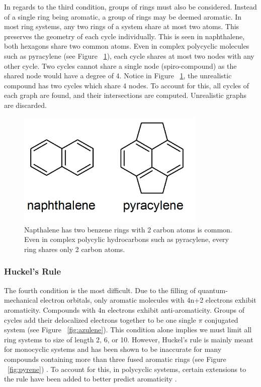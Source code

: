 \documentclass[12pt]{article}
\begin{document}
In regards to the third condition, groups of rings must also be considered. Instead of a single ring being aromatic, a group of rings may be deemed aromatic. In most ring systems, any two rings of a system share at most two atoms. This preserves the geometry of each cycle individually. This is seen in naphthalene, both hexagons share two common atoms. Even in complex polycyclic molecules such as pyracylene (see Figure ~\ref{fig:polycyclic}), each cycle shares at most two nodes with any other cycle. Two cycles cannot share a single node (spiro-compound) as the shared node would have a degree of 4. Notice in Figure ~\ref{fig:polycyclic}, the unrealistic compound has two cycles which share 4 nodes. To account for this, all cycles of each graph are found, and their intersections are computed. Unrealistic graphs are discarded.

\begin{figure}[ht!]
\centering
\includegraphics[width=90mm]{polycyclic.png}
\caption{Napthalene has two benzene rings with 2 carbon atoms is common. Even in complex polycylic hydrocarbons such as pyracylene, every ring shares only 2 carbon atoms.}
\label{fig:polycyclic}
\end{figure}

\subsubsection{Huckel's Rule}

The fourth condition is the most difficult. Due to the filling of quantum-mechanical electron orbitals, only aromatic molecules with 4n+2 electrons exhibit aromaticity. Compounds with 4n electrons exhibit anti-aromaticity. Groups of cycles add their delocalized electrons together to be one single $\pi$ conjugated system (see Figure ~\ref{fig:azulene}). This condition alone implies we must limit all ring systems to size of length 2, 6, or 10. However, Huckel's rule is mainly meant for monocyclic systems and has been shown to be inaccurate for many compounds containing more than three fused aromatic rings (see Figure ~\ref{fig:pyrene}) \cite{HuckelBad}. To account for this, in polycyclic systems, certain extensions to the rule have been added to better predict aromaticity \cite{HuckelExtension}.
\end{document}
